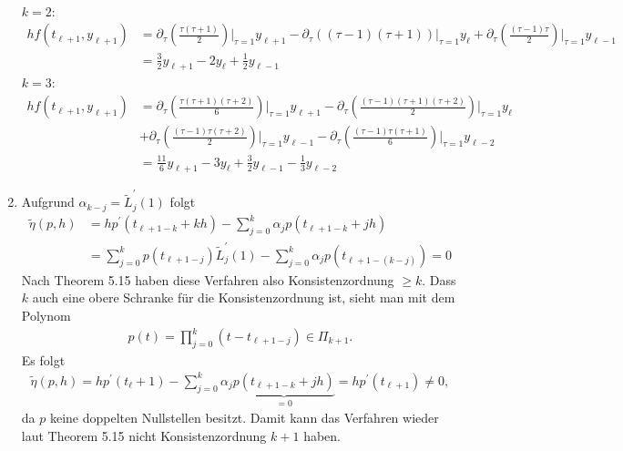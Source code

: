 \begin{solution}
\begin{enumerate}[label = \textbf{\alph*)}]
\begin{align*}
  \end{align*}
  $k = 2$:
  \begin{align*}
  hf(t_{\ell + 1},y_{\ell + 1}) &= \partial_{\tau}\left(\frac{\tau(\tau + 1)}{2}\right)
  \Bigg|_{\tau = 1}y_{\ell + 1} -
  \partial_{\tau}\left((\tau - 1)(\tau + 1)\right)
  \Bigg|_{\tau = 1}y_{\ell} +
  \partial_{\tau}\left(\frac{(\tau - 1)\tau}{2}\right)
  \Bigg|_{\tau = 1}y_{\ell - 1} \\
  &= \frac{3}{2}y_{\ell + 1} - 2y_{\ell} + \frac{1}{2}y_{\ell - 1}
  \end{align*}
  $k = 3$:
  \begin{align*}
  hf(t_{\ell + 1},y_{\ell + 1}) &= \partial_{\tau}\left(\frac{\tau(\tau + 1)(\tau + 2)}{6}\right)
  \Bigg|_{\tau = 1}y_{\ell + 1} -
  \partial_{\tau}\left(\frac{(\tau - 1)(\tau + 1)(\tau + 2)}{2}\right)
  \Bigg|_{\tau = 1}y_{\ell} \\
  &+ \partial_{\tau}\left(\frac{(\tau - 1)\tau(\tau + 2)}{2}\right)
  \Bigg|_{\tau = 1}y_{\ell - 1} -
  \partial_{\tau}\left(\frac{(\tau - 1)\tau(\tau + 1)}{6}\right)
  \Bigg|_{\tau = 1}y_{\ell - 2}
  \\
  &= \frac{11}{6}y_{\ell + 1} - 3y_{\ell} + \frac{3}{2}y_{\ell - 1} - \frac{1}{3}y_{\ell - 2}
  \end{align*}
  \item Aufgrund $\alpha_{k-j} = \tilde{L}_j^{\prime}(1)$ folgt
  \begin{align*}
    \tilde{\eta}(p,h) &= hp^{\prime}(t_{\ell + 1 - k} + kh)
    - \sum_{j = 0}^k \alpha_jp(t_{\ell + 1 - k} + jh) \\
    &= \sum_{j= 0}^k p(t_{\ell + 1 - j})\tilde{L}_j^{\prime}(1)
    - \sum_{j = 0}^k \alpha_jp(t_{\ell + 1 - (k - j)}) = 0
  \end{align*}
  Nach Theorem 5.15 haben diese Verfahren also Konsistenzordnung $\geq k$.
  Dass $k$ auch eine obere Schranke für die Konsistenzordnung ist, sieht man mit
  dem Polynom
  \begin{align*}
    p(t) = \prod_{j = 0}^k (t- t_{\ell + 1 - j}) \in \Pi_{k+1}.
  \end{align*}
  Es folgt
  \begin{align*}
    \tilde{\eta}(p,h) = hp^{\prime}(t_\ell + 1) - \sum_{j = 0}^k \alpha_j \underbrace{p(t_{\ell + 1 -k} + jh)}_{=0}
    = hp^{\prime}(t_{\ell + 1}) \neq 0,
  \end{align*}
  da $p$ keine doppelten Nullstellen besitzt.
  Damit kann das Verfahren wieder laut Theorem 5.15 nicht Konsistenzordnung $k + 1$ haben.
\end{enumerate}
\end{solution}
